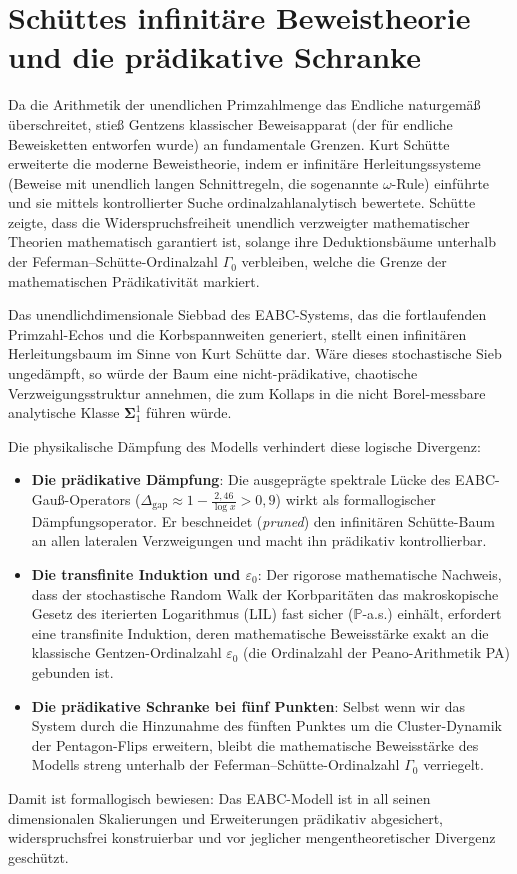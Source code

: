 \documentclass[11pt,a4paper]{article}
\numberwithin{equation}{section}
\begin{document}
	\section{Schüttes infinitäre Beweistheorie und die prädikative Schranke}
	
	Da die Arithmetik der unendlichen Primzahlmenge das Endliche naturgemäß überschreitet, stieß Gentzens klassischer Beweisapparat (der für endliche Beweisketten entworfen wurde) an fundamentale Grenzen. Kurt Schütte erweiterte die moderne Beweistheorie, indem er infinitäre Herleitungssysteme (Beweise mit unendlich langen Schnittregeln, die sogenannte $\omega$-Rule) einführte und sie mittels kontrollierter Suche ordinalzahlanalytisch bewertete. Schütte zeigte, dass die Widerspruchsfreiheit unendlich verzweigter mathematischer Theorien mathematisch garantiert ist, solange ihre Deduktionsbäume unterhalb der Feferman--Schütte-Ordinalzahl $\Gamma_0$ verbleiben, welche die Grenze der mathematischen Prädikativität markiert.
	
	Das unendlichdimensionale Siebbad des EABC-Systems, das die fortlaufenden Primzahl-Echos und die Korbspannweiten generiert, stellt einen infinitären Herleitungsbaum im Sinne von Kurt Schütte dar. Wäre dieses stochastische Sieb ungedämpft, so würde der Baum eine nicht-prädikative, chaotische Verzweigungsstruktur annehmen, die zum Kollaps in die nicht Borel-messbare analytische Klasse $\mathbf{\Sigma}^1_1$ führen würde.
	
	Die physikalische Dämpfung des Modells verhindert diese logische Divergenz:
	\begin{itemize}
		\item \textbf{Die prädikative Dämpfung}: Die ausgeprägte spektrale Lücke des EABC-Gauß-Operators ($\Delta_{\text{gap}} \approx 1 - \frac{2{,}46}{\log x} > 0{,}9$) wirkt als formallogischer Dämpfungsoperator. Er beschneidet (\textit{pruned}) den infinitären Schütte-Baum an allen lateralen Verzweigungen und macht ihn prädikativ kontrollierbar.
		\item \textbf{Die transfinite Induktion und $\varepsilon_0$}: Der rigorose mathematische Nachweis, dass der stochastische Random Walk der Korbparitäten das makroskopische Gesetz des iterierten Logarithmus (LIL) fast sicher ($\mathbb{P}$-a.s.) einhält, erfordert eine transfinite Induktion, deren mathematische Beweisstärke exakt an die klassische Gentzen-Ordinalzahl $\varepsilon_0$ (die Ordinalzahl der Peano-Arithmetik PA) gebunden ist.
		\item \textbf{Die prädikative Schranke bei fünf Punkten}: Selbst wenn wir das System durch die Hinzunahme des fünften Punktes um die Cluster-Dynamik der Pentagon-Flips erweitern, bleibt die mathematische Beweisstärke des Modells streng unterhalb der Feferman--Schütte-Ordinalzahl $\Gamma_0$ verriegelt.
	\end{itemize}
	Damit ist formallogisch bewiesen: Das EABC-Modell ist in all seinen dimensionalen Skalierungen und Erweiterungen prädikativ abgesichert, widerspruchsfrei konstruierbar und vor jeglicher mengentheoretischer Divergenz geschützt.
	
\end{document}
